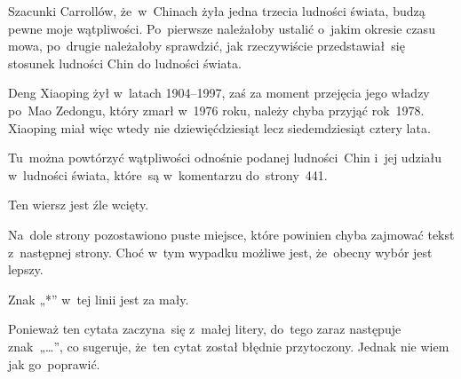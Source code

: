 \documentclass[a4paper,11pt]{article}
\begin{document}
\VerSpaceFour





\noindent
{} Szacunki Carrollów, że~w~Chinach żyła jedna trzecia
ludności świata, budzą pewne moje wątpliwości. Po~pierwsze należałoby
ustalić o~jakim okresie czasu mowa, po~drugie należałoby sprawdzić, jak
rzeczywiście przedstawiał~się stosunek ludności Chin do ludności świata.

\VerSpaceFour





\noindent
{} Deng Xiaoping żył w~latach 1904--1997, zaś za moment
przejęcia jego władzy po~Mao Zedongu, który zmarł w~1976 roku, należy
chyba przyjąć rok~1978. Xiaoping miał więc wtedy nie dziewięćdziesiąt lecz
siedemdziesiąt cztery lata.

\VerSpaceFour





\noindent
{} Tu~można powtórzyć wątpliwości odnośnie podanej
ludności~Chin i~jej udziału w~ludności świata, które~są w~komentarzu
do~strony~441.

\VerSpaceFour





\noindent
{} Ten wiersz jest źle wcięty.

\VerSpaceFour





\noindent
{} Na~dole strony pozostawiono puste miejsce, które powinien chyba
zajmować tekst z~następnej strony. Choć w~tym wypadku możliwe jest,
że~obecny wybór jest lepszy.

\VerSpaceFour





\noindent
{} Znak „*” w~tej linii jest za mały.

\VerSpaceFour





\noindent
{} Ponieważ ten cytata zaczyna~się z~małej litery, do~tego
zaraz następuje znak~„\ldots”, co sugeruje, że~ten cytat został błędnie
przytoczony. Jednak nie wiem jak go~poprawić.

\VerSpaceFour
\end{document}
